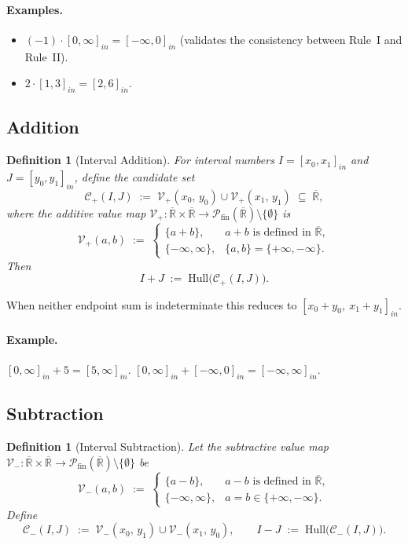 \documentclass[11pt,a4paper]{article}
\theoremstyle{paperdef}
\newtheorem{definition}[theorem]{Definition}
\newcommand{\Rext}{\overline{\mathbb{R}}}
\newcommand{\inI}[1]{[#1]_{in}}
\newcommand{\V}{\mathcal{V}}
\newcommand{\Cand}{\mathcal{C}}
\begin{document}
\paragraph{Examples.}
\begin{itemize}[leftmargin=2em]
  \item $(-1) \cdot \inI{0, \infty} = \inI{-\infty, 0}$
    (validates the consistency between Rule~I and Rule~II).
  \item $2 \cdot \inI{1, 3} = \inI{2, 6}$.
\end{itemize}

\subsection{Addition}\label{sec:addition}

\begin{definition}[Interval Addition]\label{def:addition}
For interval numbers $I = \inI{x_0, x_1}$ and $J = \inI{y_0, y_1}$,
define the candidate set
\[
\Cand_{+}(I, J) \;:=\; \V_{+}(x_0,\, y_0) \cup \V_{+}(x_1,\, y_1)
\;\subseteq\; \Rext,
\]
where the additive value map $\V_{+} : \Rext \times \Rext \to
\mathcal{P}_{\mathrm{fin}}(\Rext) \setminus \{\emptyset\}$ is
\[
\V_{+}(a, b) \;:=\;
\begin{cases}
\{a + b\}, & a + b \text{ is defined in $\Rext$}, \\
\{-\infty, \infty\}, & \{a, b\} = \{+\infty, -\infty\}.
\end{cases}
\]
Then
\[
I + J \;:=\; \mathrm{Hull}\bigl(\Cand_{+}(I, J)\bigr).
\]
\end{definition}

When neither endpoint sum is indeterminate this reduces to
$\inI{x_0 + y_0,\ x_1 + y_1}$.

\paragraph{Example.} $\inI{0, \infty} + 5 = \inI{5, \infty}$.
$\inI{0, \infty} + \inI{-\infty, 0} = \inI{-\infty, \infty}$.

\subsection{Subtraction}\label{sec:subtraction}

\begin{definition}[Interval Subtraction]\label{def:subtraction}
Let the subtractive value map $\V_{-} : \Rext \times \Rext \to
\mathcal{P}_{\mathrm{fin}}(\Rext) \setminus \{\emptyset\}$ be
\[
\V_{-}(a, b) \;:=\;
\begin{cases}
\{a - b\}, & a - b \text{ is defined in $\Rext$}, \\
\{-\infty, \infty\}, & a = b \in \{+\infty, -\infty\}.
\end{cases}
\]
Define
\[
\Cand_{-}(I, J) \;:=\; \V_{-}(x_0,\, y_1) \cup \V_{-}(x_1,\, y_0),
\qquad
I - J \;:=\; \mathrm{Hull}\bigl(\Cand_{-}(I, J)\bigr).
\]
\end{definition}
\end{document}
